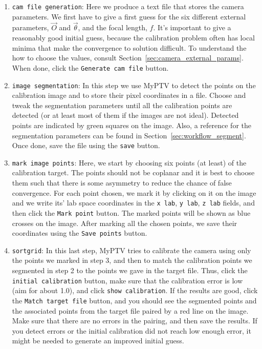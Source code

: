 \documentclass[10pt,a4paper]{article}
\begin{document}
\begin{enumerate}
	\item \texttt{cam file generation}: Here we produce a text file that stores the camera parameters. We first have to give a first guess for the six different external parameters, $\vec{O}$ and $\vec{\theta}$, and the focal length, $f$. It's important to give a reasonably good initial guess, because the calibration problem often has local minima that make the convergence to solution difficult. To understand the how to choose the values, consult Section~\ref{sec:camera_external_params}. When done, click the \texttt{Generate cam file} button.  
	
	\item \texttt{image segmentation}: In this step we use MyPTV to detect the points on the calibration image and to store their pixel coordinates in a file. Choose and tweak the segmentation parameters until all the calibration points are detected (or at least most of them if the images are not ideal). Detected points are indicated by green squares on the image. Also, a reference for the segmentation parameters can be found in Section~\ref{sec:workflow_segment}. Once done, save the file using the \texttt{save} button.
	
	\item \texttt{mark image points}: Here, we start by choosing six points (at least) of the calibration target. The points should not be coplanar and it is best to choose them such that there is some asymmetry to reduce the chance of false convergence. For each point chosen, we mark it by clicking on it on the image and we write its' lab space coordinates in the \texttt{x lab}, \texttt{y lab}, \texttt{z lab} fields, and then click the \texttt{Mark point} button. The marked points will be shown as blue crosses on the image. After marking all the chosen points, we save their coordinates using the \texttt{Save points} button.
	
	\item \texttt{sortgrid}: In this last step, MyPTV tries to calibrate the camera using only the points we marked in step 3, and then to match the calibration points we segmented in step 2 to the points we gave in the target file. Thus, click the \texttt{initial calibration} button, make sure that the calibration error is low (aim for about 1.0), and click \texttt{show calibration}. If the results are good, click the \texttt{Match target file} button, and you should see the segmented points and the associated points from the target file paired by a red line on the image. Make sure that there are no errors in the pairing, and then save the results. If you detect errors or the initial calibration did not reach low enough error, it might be needed to generate an improved initial guess.  
		 
\end{enumerate}
 
\end{document}
